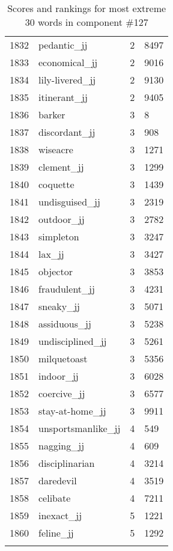 \begin{longtable}[!htbp]{| rlr@{.}l |}
    1832 & pedantic\_jj & 2 & 8497 \\
    1833 & economical\_jj & 2 & 9016 \\
    1834 & lily-livered\_jj & 2 & 9130 \\
    1835 & itinerant\_jj & 2 & 9405 \\
    1836 & barker & 3 & 8 \\
    1837 & discordant\_jj & 3 & 908 \\
    1838 & wiseacre & 3 & 1271 \\
    1839 & clement\_jj & 3 & 1299 \\
    1840 & coquette & 3 & 1439 \\
    1841 & undisguised\_jj & 3 & 2319 \\
    1842 & outdoor\_jj & 3 & 2782 \\
    1843 & simpleton & 3 & 3247 \\
    1844 & lax\_jj & 3 & 3427 \\
    1845 & objector & 3 & 3853 \\
    1846 & fraudulent\_jj & 3 & 4231 \\
    1847 & sneaky\_jj & 3 & 5071 \\
    1848 & assiduous\_jj & 3 & 5238 \\
    1849 & undisciplined\_jj & 3 & 5261 \\
    1850 & milquetoast & 3 & 5356 \\
    1851 & indoor\_jj & 3 & 6028 \\
    1852 & coercive\_jj & 3 & 6577 \\
    1853 & stay-at-home\_jj & 3 & 9911 \\
    1854 & unsportsmanlike\_jj & 4 & 549 \\
    1855 & nagging\_jj & 4 & 609 \\
    1856 & disciplinarian & 4 & 3214 \\
    1857 & daredevil & 4 & 3519 \\
    1858 & celibate & 4 & 7211 \\
    1859 & inexact\_jj & 5 & 1221 \\
    1860 & feline\_jj & 5 & 1292 \\
    \hline
    \caption{Scores and rankings for most extreme 30 words in component \#127} \\
\end{longtable}
